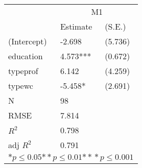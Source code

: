 \begin{tabular}{*{3}{l}}
\hline
                  & \multicolumn{2}{c}{M1}   \tabularnewline
                   &Estimate  &(S.E.)  \tabularnewline
 \hline
 \hline
   (Intercept)     &-2.698   &   (5.736) \tabularnewline
   education       &4.573***   &   (0.672) \tabularnewline
   typeprof        &6.142   &   (4.259) \tabularnewline
   typewc          &-5.458*   &   (2.691) \tabularnewline
 \hline
 N                 &98       &        \tabularnewline
 RMSE             &7.814         & \tabularnewline
 $R^2$             &0.798         & \tabularnewline
 adj $R^2$         &0.791         & \tabularnewline
 \hline
\hline
 
 \multicolumn{3}{c}{${*  p}\le 0.05$${*\!\!*  p}\le 0.01$${*\!\!*\!\!*  p}\le 0.001$}\tabularnewline
 \end{tabular}